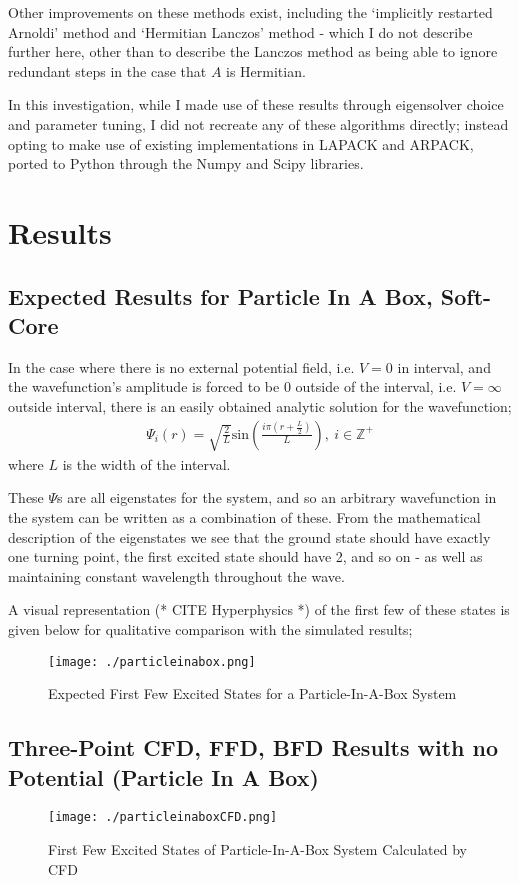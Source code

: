 Other improvements on these methods exist, including the `implicitly restarted Arnoldi' method and `Hermitian Lanczos' method - which I do not describe further here, other than to describe the Lanczos method as being able to ignore redundant steps in the case that $A$ is Hermitian.


In this investigation, while I made use of these results through eigensolver choice and parameter tuning, I did not recreate any of these algorithms directly; instead opting to make use of existing implementations in LAPACK and ARPACK, ported to Python through the Numpy and Scipy libraries.

\section{Results}
\subsection{Expected Results for Particle In A Box, Soft-Core}
In the case where there is no external potential field, i.e. $V=0$ in interval, and the wavefunction's amplitude is forced to be $0$ outside of the interval, i.e. $V=\infty$ outside interval, there is an easily obtained analytic solution for the wavefunction; 
\begin{align*}
	\Psi_{i}\left(r\right) = \sqrt{\frac{2}{L}}\text{sin}\left(\frac{i\pi \left(r + \frac{L}{2}\right)}{L}\right),\ i\in \mathbb{Z}^{+}
\end{align*}
where $L$ is the width of the interval.

These $\Psi$s are all eigenstates for the system, and so an arbitrary wavefunction in the system can be written as a combination of these. From the mathematical description of the eigenstates we see that the ground state should have exactly one turning point, the first excited state should have 2, and so on - as well as maintaining constant wavelength throughout the wave.

A visual representation (* CITE Hyperphysics *) of the first few of these states is given below for qualitative comparison with the simulated results;

\begin{figure}[H]
	\texttt{[image: ./particleinabox.png]}
	\centering
	\caption{Expected First Few Excited States for a Particle-In-A-Box System}
\end{figure}


\subsection{Three-Point CFD, FFD, BFD Results with no Potential (Particle In A Box)}
\begin{figure}[H]
	\texttt{[image: ./particleinaboxCFD.png]}
	\centering
	\caption{First Few Excited States of Particle-In-A-Box System Calculated by CFD}
\end{figure}

